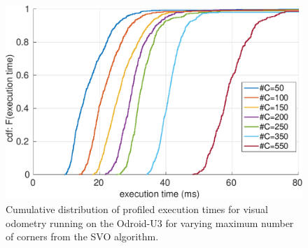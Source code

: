 \begin{figure}[htbp]
  \centering
  \includegraphics[width=0.9\columnwidth]{figures/time_ecdf_millisec.pdf}
  \caption{Cumulative distribution of profiled execution times for visual odometry running on the Odroid-U3 for varying maximum number of corners from the SVO algorithm.}
  \label{fig:time_ecdf}
\end{figure}